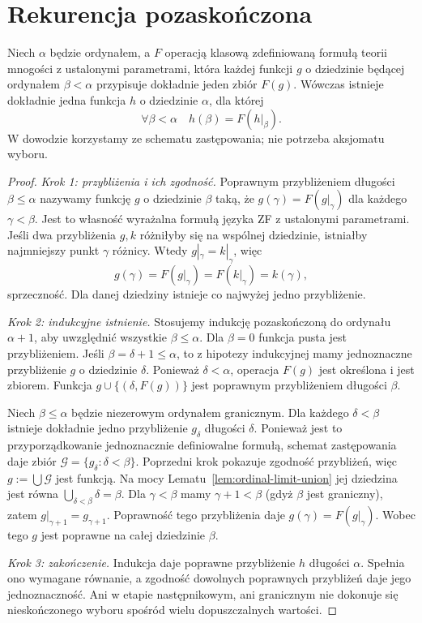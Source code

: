 \section{Rekurencja pozaskończona}
\begin{twierdzenie}\label{thm:ordinal-recursion}
Niech $\alpha$ będzie ordynałem, a $F$ operacją klasową zdefiniowaną formułą teorii mnogości z ustalonymi parametrami, która każdej funkcji $g$ o dziedzinie będącej ordynałem $\beta<\alpha$ przypisuje dokładnie jeden zbiór $F(g)$. Wówczas istnieje dokładnie jedna funkcja $h$ o dziedzinie $\alpha$, dla której
\[
\forall\beta<\alpha\quad h(\beta)=F(h|_\beta).
\]
W dowodzie korzystamy ze schematu zastępowania; nie potrzeba aksjomatu wyboru.
\end{twierdzenie}
\begin{proof}
\emph{Krok 1: przybliżenia i ich zgodność.}
Poprawnym przybliżeniem długości
$\beta\le\alpha$ nazywamy funkcję
$g$ o dziedzinie $\beta$ taką, że
$g(\gamma)=F(g|_\gamma)$ dla każdego $\gamma<\beta$.
Jest to własność wyrażalna formułą
języka ZF z ustalonymi parametrami.
Jeśli dwa przybliżenia $g,k$
różniłyby się na wspólnej dziedzinie,
istniałby najmniejszy punkt $\gamma$ różnicy.
Wtedy $g|_\gamma=k|_\gamma$, więc
\[
g(\gamma)=F(g|_\gamma)=F(k|_\gamma)=k(\gamma),
\]
sprzeczność.
Dla danej dziedziny istnieje co najwyżej
jedno przybliżenie.

\emph{Krok 2: indukcyjne istnienie.}
Stosujemy indukcję pozaskończoną
do ordynału $\alpha+1$, aby uwzględnić
wszystkie $\beta\le\alpha$.
Dla $\beta=0$ funkcja pusta jest przybliżeniem.
Jeśli $\beta=\delta+1\le\alpha$,
to z hipotezy indukcyjnej mamy
jednoznaczne przybliżenie $g$
o dziedzinie $\delta$.
Ponieważ $\delta<\alpha$,
operacja $F(g)$ jest określona
i jest zbiorem.
Funkcja $g\cup\{(\delta,F(g))\}$
jest poprawnym przybliżeniem długości $\beta$.

Niech $\beta\le\alpha$ będzie
niezerowym ordynałem granicznym.
Dla każdego $\delta<\beta$
istnieje dokładnie jedno
przybliżenie $g_\delta$ długości $\delta$.
Ponieważ jest to przyporządkowanie
jednoznacznie definiowalne formułą,
schemat zastępowania daje zbiór
$\mathcal G=\{g_\delta:\delta<\beta\}$.
Poprzedni krok pokazuje zgodność
przybliżeń, więc $g:=\bigcup\mathcal G$
jest funkcją.
Na mocy Lematu~\ref{lem:ordinal-limit-union}
jej dziedzina jest równa
$\bigcup_{\delta<\beta}\delta=\beta$.
Dla $\gamma<\beta$ mamy
$\gamma+1<\beta$ (gdyż $\beta$ jest graniczny),
zatem $g|_{\gamma+1}=g_{\gamma+1}$.
Poprawność tego przybliżenia
daje $g(\gamma)=F(g|_\gamma)$.
Wobec tego $g$ jest poprawne
na całej dziedzinie $\beta$.

\emph{Krok 3: zakończenie.}
Indukcja daje poprawne przybliżenie
$h$ długości $\alpha$.
Spełnia ono wymagane równanie,
a zgodność dowolnych poprawnych
przybliżeń daje jego jednoznaczność.
Ani w etapie następnikowym, ani granicznym
nie dokonuje się nieskończonego
wyboru spośród wielu dopuszczalnych wartości.
\end{proof}
